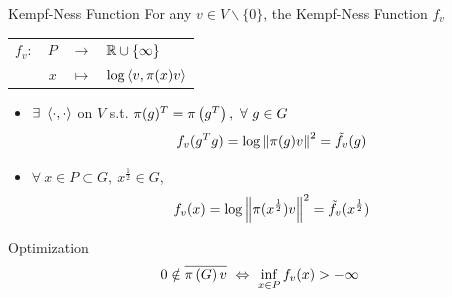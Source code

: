\documentclass{beamer}
\begin{document}
	\begin{frame}{Kempf-Ness Function}
		For any $v \in V\backslash \{0\}$, the Kempf-Ness Function $f_v$
		\begin{center}
			\begin{tabular}{rrcl}
				$f_v \colon$ & $P$ & $\longrightarrow$ & $\mathbb{R}\cup\{\infty\}$\\
				~ & $x$ & $\longmapsto$ & $\log \left\langle v,\pi(x)v \right\rangle$
			\end{tabular}
		\end{center}
		\begin{itemize}
			\item \cite{key16} $\exists~\left\langle \cdot,\cdot \right\rangle$ on $V$ s.t. $\pi(g)^T = \pi\left(g^T\right),~\forall~g \in G$
			\vspace{-0.5em}
			\begin{equation*}
				f_v(g^Tg) = \log \norm{\pi(g)v}^2 = \tilde{f}_v(g)
				\vspace{-0.5em}
			\end{equation*}
			\item $\forall~x \in P \subset G,~x^{\frac{1}{2}} \in G$,
			\vspace{-0.5em}
			\begin{equation*}
				f_v(x) = \log \norm{\pi(x^{\frac{1}{2}})v}^2 = \tilde{f}_v(x^{\frac{1}{2}})
				\vspace{-0.5em}
			\end{equation*}
		\end{itemize}
		\begin{block}{Optimization}
			\begin{equation*}
				0 \notin \overline{\pi\left(G\right)v} ~\Leftrightarrow~ \inf_{x \in P} f_v(x) > -\infty
			\end{equation*}
		\end{block}
	\end{frame}
\end{document}
